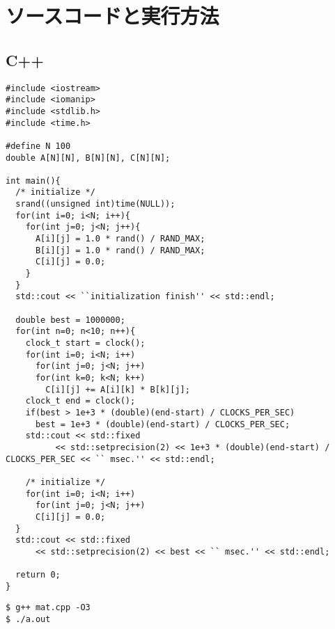 \documentclass[onecolumn]{preport}
\begin{document}

\section{ソースコードと実行方法}
\subsection{C++}
\begin{lstlisting}[basicstyle=\ttfamily\footnotesize, frame=single, caption=mat.cpp]
#include <iostream>
#include <iomanip>
#include <stdlib.h>
#include <time.h>

#define N 100
double A[N][N], B[N][N], C[N][N];

int main(){
  /* initialize */
  srand((unsigned int)time(NULL));
  for(int i=0; i<N; i++){
    for(int j=0; j<N; j++){
      A[i][j] = 1.0 * rand() / RAND_MAX;
      B[i][j] = 1.0 * rand() / RAND_MAX;
      C[i][j] = 0.0;
    }
  }
  std::cout << ``initialization finish'' << std::endl;

  double best = 1000000;
  for(int n=0; n<10; n++){
    clock_t start = clock();
    for(int i=0; i<N; i++)
      for(int j=0; j<N; j++)
      for(int k=0; k<N; k++)
        C[i][j] += A[i][k] * B[k][j];
    clock_t end = clock();
    if(best > 1e+3 * (double)(end-start) / CLOCKS_PER_SEC)
      best = 1e+3 * (double)(end-start) / CLOCKS_PER_SEC;
    std::cout << std::fixed
          << std::setprecision(2) << 1e+3 * (double)(end-start) / CLOCKS_PER_SEC << `` msec.'' << std::endl;

    /* initialize */
    for(int i=0; i<N; i++)
      for(int j=0; j<N; j++)
      C[i][j] = 0.0;
  }
  std::cout << std::fixed
      << std::setprecision(2) << best << `` msec.'' << std::endl;

  return 0;
}
\end{lstlisting}
\begin{lstlisting}[basicstyle=\ttfamily\footnotesize, frame=single]
$ g++ mat.cpp -O3
$ ./a.out
\end{lstlisting}
\end{document}

